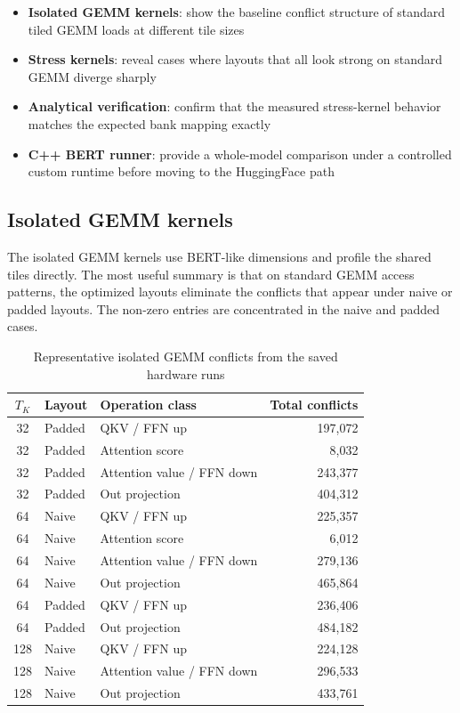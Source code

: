 \documentclass[11pt,a4paper]{article}
\begin{document}
\begin{itemize}
\item \textbf{Isolated GEMM kernels}: show the baseline conflict structure of
      standard tiled GEMM loads at different tile sizes
\item \textbf{Stress kernels}: reveal cases where layouts that all look strong
      on standard GEMM diverge sharply
\item \textbf{Analytical verification}: confirm that the measured stress-kernel
      behavior matches the expected bank mapping exactly
\item \textbf{C++ BERT runner}: provide a whole-model comparison under a
      controlled custom runtime before moving to the HuggingFace path
\end{itemize}

\subsection{Isolated GEMM kernels}

The isolated GEMM kernels use BERT-like dimensions and profile the shared tiles
directly.  The most useful summary is that on standard GEMM access patterns,
the optimized layouts eliminate the conflicts that appear under naive or padded
layouts.  The non-zero entries are concentrated in the naive and padded cases.

\begin{table}[H]
\centering
\caption{Representative isolated GEMM conflicts from the saved hardware runs}
\begin{tabular}{cllr}
\toprule
$T_K$ & Layout & Operation class & Total conflicts \\
\midrule
32 & Padded & QKV / FFN up & 197,072 \\
32 & Padded & Attention score & 8,032 \\
32 & Padded & Attention value / FFN down & 243,377 \\
32 & Padded & Out projection & 404,312 \\
\midrule
64 & Naive & QKV / FFN up & 225,357 \\
64 & Naive & Attention score & 6,012 \\
64 & Naive & Attention value / FFN down & 279,136 \\
64 & Naive & Out projection & 465,864 \\
64 & Padded & QKV / FFN up & 236,406 \\
64 & Padded & Out projection & 484,182 \\
\midrule
128 & Naive & QKV / FFN up & 224,128 \\
128 & Naive & Attention value / FFN down & 296,533 \\
128 & Naive & Out projection & 433,761 \\
\bottomrule
\end{tabular}
\end{table}
\end{document}

